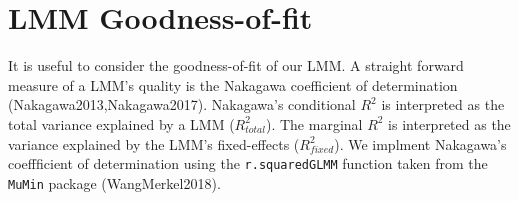 \documentclass[11pt]{elife}
\begin{document}
\begin{knitrout}
\color{fgcolor}\begin{kframe}
\begin{alltt}
 \hlkwb{<-} \hlopt{::}
 \hlkwb{<-} \hlstd{(}\hlstd{(}\hlstd{,}  \hlstd{=} 
\hlstd{contrast7[}\hlstd{]} \hlkwb{<-} \hlopt{+} 
\hlstd{contrast7[}\hlstd{]} \hlkwb{<-} \hlopt{-} 

\end{alltt}
\end{kframe}
\end{knitrout}

\begin{knitrout}
\color{fgcolor}\begin{kframe}
\begin{alltt}
 \hlkwb{<-}  \hlstd{,}\hlstd{)}

\end{alltt}
\end{kframe}
\end{knitrout}


\section{LMM Goodness-of-fit}

It is useful to consider the goodness-of-fit of our LMM. A straight forward
measure of a LMM's quality is the Nakagawa coefficient of 
determination (Nakagawa2013,Nakagawa2017). Nakagawa's conditional $R^2$ is 
interpreted as the total variance explained by a LMM ($R^2_{total}$).
The marginal $R^2$ is interpreted as the variance explained by the LMM's 
fixed-effects ($R^2_{fixed}$). We implment Nakagawa's coeffficient of 
determination using the \texttt{r.squaredGLMM} function taken from the 
\texttt{MuMin} package (WangMerkel2018).\\
\end{document}
